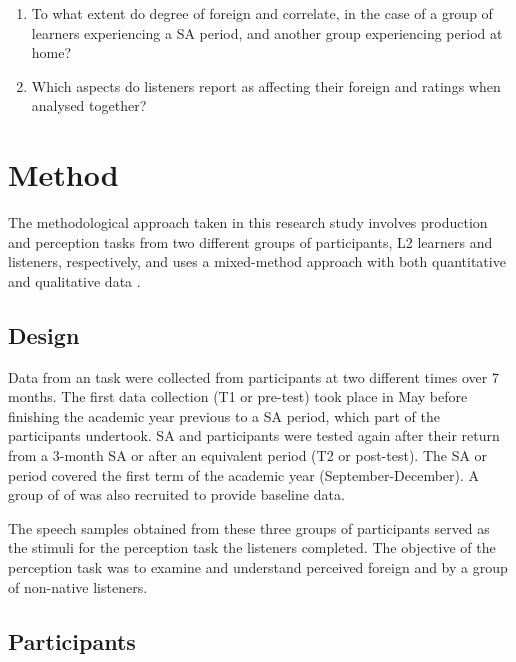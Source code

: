 \documentclass[output=paper]{langsci/langscibook}
\begin{document}
\begin{enumerate}
\item 
To what extent do degree of foreign  and  correlate, in the case of a group of  learners experiencing a SA period, and another group experiencing  period at home?
\item 
Which aspects do listeners report as affecting their foreign  and  ratings when analysed together? 

\end{enumerate}


\section{Method}

The methodological approach taken in this research study involves production and perception tasks from two different groups of participants, {L2} learners and listeners, respectively, and uses a mixed-method approach with both quantitative and qualitative data \citep{Dörnyei2007}.


\subsection{Design}


Data from an  task were collected from participants at two different times over 7 months. The first data collection (T1 or pre-test) took place in May before finishing the academic year previous to a SA period, which part of the participants undertook. SA and  participants were tested again after their return from a 3-month SA or after an equivalent  period (T2 or post-test). The SA or  period covered the first term of the academic year (September-December). A group of  of  was also recruited to provide baseline data. 

The speech samples obtained from these three groups of participants served as the stimuli for the perception task the listeners completed. The objective of the perception task was to examine and understand perceived foreign  and  by a group of non-native listeners.


\subsection{Participants}
\end{document}
